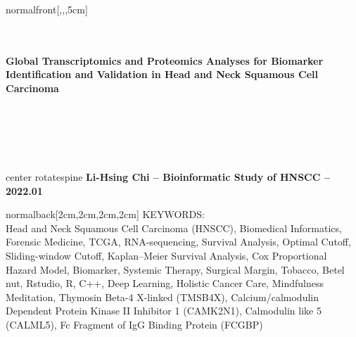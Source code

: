 \documentclass[
    coverwidth=213mm, %
    coverheight=303mm, %
    spinewidth=17.8mm, %
    bleedwidth=3mm,
    12pt,
    trimmed=false
    ]{bookcover}
\begin{document}
\begin{bookcover}
\begin{bookcoverelement}{normal}{front}[,,,5cm]
    \centering %
    \color{black}\sffamily\bfseries
    \\[20mm]
    \\[6mm]
    \\[110mm]
    \parbox{160mm}{ %
    {\bfseries\large 
    Global Transcriptomics and Proteomics Analyses for Biomarker Identification and Validation in Head and Neck Squamous Cell Carcinoma}}\\[40mm]
    \\[5mm]
    \\[7mm]
    \\[26mm]

\end{bookcoverelement}



\begin{bookcoverelement}{center rotate}{spine}
    \huge\sffamily\bfseries
    {Li-Hsing Chi -- Bioinformatic Study of HNSCC -- 2022.01}
\end{bookcoverelement}

\begin{bookcoverelement}{normal}{back}[2cm,2cm,2cm,2cm]
    \color{gray}%
{\large KEYWORDS:\\}
Head and Neck Squamous Cell Carcinoma (HNSCC),
Biomedical Informatics,
Forensic Medicine,
TCGA,
RNA-sequencing,
Survival Analysis,
Optimal Cutoff, Sliding-window Cutoff,
Kaplan--Meier Survival Analysis, Cox Proportional Hazard Model,
Biomarker,
Systemic Therapy,
Surgical Margin,
Tobacco, Betel nut,
Rstudio, R, C++, Deep Learning,
Holistic Cancer Care,
Mindfulness Meditation,
Thymosin Beta-4 X-linked (TMSB4X), %
Calcium/calmodulin Dependent Protein Kinase II Inhibitor 1 (CAMK2N1),
Calmodulin like 5 (CALML5),
Fc Fragment of IgG Binding Protein (FCGBP)


\end{bookcoverelement}
\end{bookcover}
\end{document}
